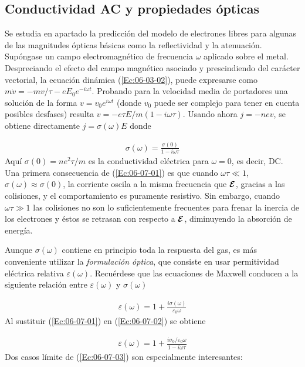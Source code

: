 \subsection{Conductividad AC y propiedades ópticas}

Se estudia en apartado la predicción del modelo de electrones libres para algunas de las magnitudes ópticas básicas como la reflectividad y la atenuación. Supóngase un campo electromagnético de frecuencia $\omega$ aplicado sobre el metal. Despreciando el efecto del campo magnético asociado y prescindiendo del carácter vectorial, la ecuación dinámica (\ref{Ec:06-03-02}), puede expresarse como $m\dot{v}=-mv/\tau-eE_0e^{-i\omega t}$. Probando para la velocidad media de portadores una solución de la forma $v=v_0 e^{i\omega t}$ (donde $v_0$ puede ser complejo para tener en cuenta posibles desfases) resulta $v=-e\tau E / m(1-i\omega\tau)$. Usando ahora $j=-nev$, se obtiene directamente $j=\sigma(\omega)E$ donde 

\begin{eqnarray}
	\sigma (\omega) = \frac{\sigma(0)}{1-i \omega \tau} \label{Ec:06-07-01}
\end{eqnarray}
Aquí $\sigma (0) = ne^2 \tau/m$ es la conductividad eléctrica para $\omega=0$, es decir, DC. Una primera consecuencia de (\ref{Ec:06-07-01}) es que cuando $\omega \tau \ll 1$, $\sigma (\omega) \approx \sigma (0)$, la corriente oscila a la misma frecuencia que $\boldsymbol{\mathcal{E}}$, gracias a las colisiones, y el comportamiento es puramente resistivo. Sin embargo, cuando $\omega \tau \gg 1$ las colisiones no son lo suficientemente frecuentes para frenar la inercia de los electrones y éstos se retrasan con respecto a $\boldsymbol{\mathcal{E}}$, diminuyendo la absorción de energía.

Aunque $\sigma (\omega)$ contiene en principio toda la respuesta del gas, es más conveniente utilizar la \textit{formulación óptica}, que consiste en usar permitividad eléctrica relativa $\varepsilon(\omega)$. Recuérdese que las ecuaciones de Maxwell conducen a la siguiente relación entre $\varepsilon (\omega)$ y $\sigma (\omega)$ 

\begin{eqnarray}
	\varepsilon (\omega) = 1 + \frac{i \sigma(\omega)}{\varepsilon_0 \omega} \label{Ec:06-07-02}
\end{eqnarray}
Al sustituir (\ref{Ec:06-07-01}) en (\ref{Ec:06-07-02}) se obtiene 

\begin{eqnarray}
	\varepsilon(\omega) = 1 + \frac{i \sigma_0 / \varepsilon_0 \omega}{1-i\omega \tau} \label{Ec:06-07-03}
\end{eqnarray}
Dos casos límite de (\ref{Ec:06-07-03}) son especialmente interesantes:

